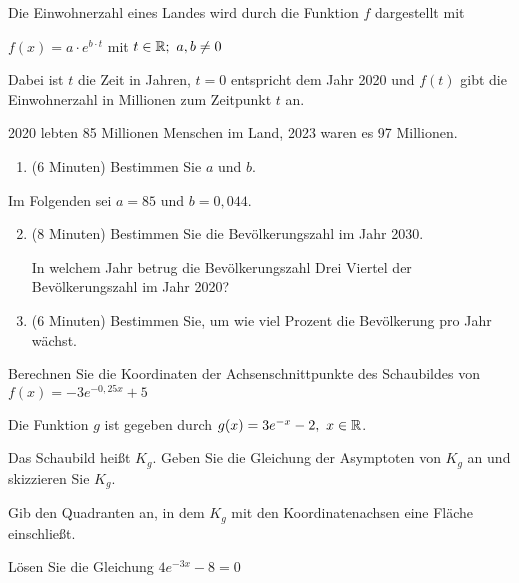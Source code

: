 \begin{Exercise}[title={Zeitansatz 20 min, mit Taschenrechner}, label=eFktVA_3]%

    Die Einwohnerzahl eines Landes wird durch die Funktion \(f\) dargestellt mit

    \(f(x)=a\cdot e^{b\cdot t}\) mit \(t\in\mathbb{R};\ a,b\neq0\)

    Dabei ist \(t\) die Zeit in Jahren, \(t=0\) entspricht dem Jahr 2020 und \(f(t)\) gibt die Einwohnerzahl in Millionen zum Zeitpunkt \(t\) an.

    2020 lebten 85 Millionen Menschen im Land, 2023 waren es 97 Millionen.

    \begin{enumerate}[label=\alph*)]
        \item (6 Minuten) Bestimmen Sie \(a\) und \(b\).
    \end{enumerate}

    Im Folgenden sei \(a=85\) und \(b=0,044\).

    \begin{enumerate}[label=\alph*)]
        \setcounter{enumi}{1}
        \item (8 Minuten) Bestimmen Sie die Bevölkerungszahl im Jahr 2030.

        In welchem Jahr betrug die Bevölkerungszahl Drei Viertel der Bevölkerungszahl im Jahr 2020?
        \item (6 Minuten) Bestimmen Sie, um wie viel Prozent die Bevölkerung pro Jahr wächst.
    \end{enumerate}
\end{Exercise}
\begin{Exercise}[title={Zeitansatz 6 min, mit Taschenrechner}, label=eFktVA_4]%

    Berechnen Sie die Koordinaten der Achsenschnittpunkte des Schaubildes von \(f(x)=-3e^{-0,25x}+5\)
\end{Exercise}
\begin{Exercise}[title={Zeitansatz 10 min, ohne Taschenrechner}, label=eFktVA_5]%

    Die Funktion \(g\) ist gegeben durch \(g(x)=3e^{-x}-2,\ x\in\R\).

    Das Schaubild heißt \(K_g\). Geben Sie die Gleichung der Asymptoten von \(K_g\) an und skizzieren Sie \(K_g\).

    Gib den Quadranten an, in dem \(K_g\) mit den Koordinatenachsen eine Fläche einschließt.
\end{Exercise}
\begin{Exercise}[title={Zeitansatz 6 min, ohne Taschenrechner}, label=eFktVA_6]%

    Lösen Sie die Gleichung \(4e^{-3x}-8=0\)
\end{Exercise}
